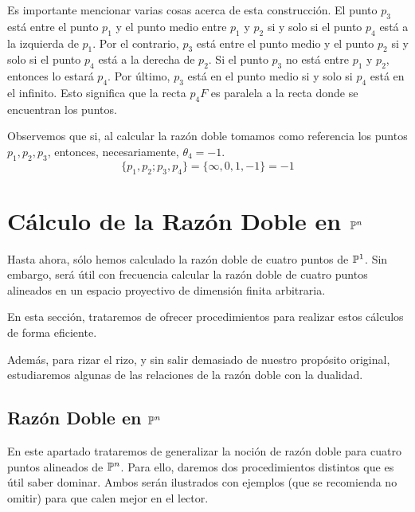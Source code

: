 Es importante mencionar varias cosas acerca de esta construcción. El punto $p_3$ está entre el punto $p_1$ y el punto medio entre $p_1$ y $p_2$ si y solo si el punto $p_4$ está a la izquierda de $p_1$. Por el contrario, $p_3$ está entre el punto medio y el punto $p_2$  si y solo si el punto $p_4$ está a la derecha de $p_2$. Si el punto $p_3$ no está entre $p_1$ y $p_2$, entonces lo estará $p_4$. Por último, $p_3$ está en el punto medio si y solo si $p_4$ está en el infinito. Esto significa que la recta $p_4F$ es paralela a la recta donde se encuentran los puntos.

Observemos que si, al calcular la razón doble tomamos como referencia los puntos $p_1,p_2,p_3$, entonces, necesariamente, $\theta_4=-1$.
\begin{equation*}
	\{p_1,p_2;p_3,p_4\}=\{\infty,0,1,-1\}=-1
\end{equation*}

\section{Cálculo de la Razón Doble en $\mathbb{P}^n$}
\label{C5_generalizacionesRazonDoble}
Hasta ahora, sólo hemos calculado la razón doble de cuatro puntos de $\mathbb{P}^1$. Sin embargo, será útil con frecuencia calcular la razón doble de cuatro puntos alineados en un espacio proyectivo de dimensión finita arbitraria.
 
En esta sección, trataremos de ofrecer procedimientos para realizar estos cálculos de forma eficiente.

Además, para rizar el rizo, y sin salir demasiado de nuestro propósito original, estudiaremos algunas de las relaciones de la razón doble con la dualidad.
\subsection{Razón Doble en $\mathbb{P}^n$}
En este apartado trataremos de generalizar la noción de razón doble para cuatro puntos alineados de $\mathbb{P}^n$. Para ello, daremos dos procedimientos distintos que es útil saber dominar. Ambos serán ilustrados con ejemplos (que se recomienda no omitir) para que calen mejor en el lector.
